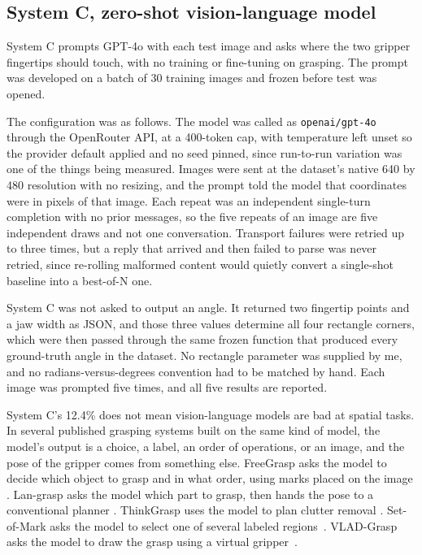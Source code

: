 \documentclass[12pt,letterpaper]{article}
\begin{document}
\subsection{System C, zero-shot vision-language model}

System C prompts GPT-4o with each test image and asks where the two
gripper fingertips should touch, with no training or fine-tuning on
grasping. The prompt was developed on a batch of 30 training images and
frozen before test was opened.

The configuration was as follows. The model was called as
\texttt{openai/gpt-4o} through the OpenRouter API, at a 400-token cap,
with temperature left unset so the provider default applied and no seed
pinned, since run-to-run variation was one of the things being
measured. Images were sent at the dataset's native 640 by 480
resolution with no resizing, and the prompt told the model that
coordinates were in pixels of that image. Each repeat was an
independent single-turn completion with no prior messages, so the five
repeats of an image are five independent draws and not one
conversation. Transport failures were retried up to three times, but a
reply that arrived and then failed to parse was never retried, since
re-rolling malformed content would quietly convert a single-shot
baseline into a best-of-N one.

System C was not asked to output an angle. It returned two fingertip
points and a jaw width as JSON, and those three values determine all
four rectangle corners, which were then passed through the same frozen
function that produced every ground-truth angle in the dataset. No
rectangle parameter was supplied by me, and no radians-versus-degrees
convention had to be matched by hand. Each image was prompted five
times, and all five results are reported.

System C's 12.4\% does not mean vision-language models are bad at
spatial tasks. In several published grasping systems built on the same
kind of model, the model's output is a choice, a label, an order of
operations, or an image, and the pose of the gripper comes from
something else. FreeGrasp asks the model to decide which object to
grasp and in what order, using marks placed on the image \cite{jiao2025}.
Lan-grasp asks the model which part to grasp, then hands the pose to a
conventional planner \cite{mirjalili2023}. ThinkGrasp uses the model to
plan clutter removal \cite{qian2024}. Set-of-Mark asks the model to
select one of several labeled regions~\cite{yang2024}. VLAD-Grasp asks
the model to draw the grasp using a virtual gripper~\cite{kulshrestha2025}.
\end{document}
